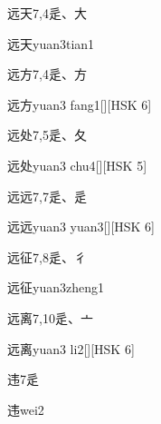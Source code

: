 \begin{Entry}{远天}{7,4}{⾡、⼤}
  \begin{Phonetics}{远天}{yuan3tian1}
  \end{Phonetics}
\end{Entry}

\begin{Entry}{远方}{7,4}{⾡、⽅}
  \begin{Phonetics}{远方}{yuan3 fang1}[][HSK 6]
  \end{Phonetics}
\end{Entry}

\begin{Entry}{远处}{7,5}{⾡、⼡}
  \begin{Phonetics}{远处}{yuan3 chu4}[][HSK 5]
  \end{Phonetics}
\end{Entry}

\begin{Entry}{远远}{7,7}{⾡、⾡}
  \begin{Phonetics}{远远}{yuan3 yuan3}[][HSK 6]
  \end{Phonetics}
\end{Entry}

\begin{Entry}{远征}{7,8}{⾡、⼻}
  \begin{Phonetics}{远征}{yuan3zheng1}
  \end{Phonetics}
\end{Entry}

\begin{Entry}{远离}{7,10}{⾡、⼇}
  \begin{Phonetics}{远离}{yuan3 li2}[][HSK 6]
  \end{Phonetics}
\end{Entry}

\begin{Entry}{违}{7}{⾡}
  \begin{Phonetics}{违}{wei2}
  \end{Phonetics}
\end{Entry}

